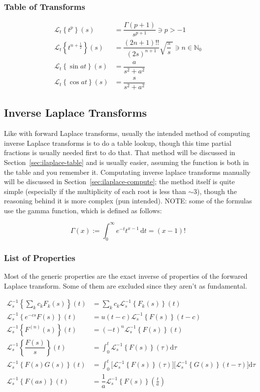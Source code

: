 \documentclass[12pt]{article}
\newcommand \Laplace [3] {\ensuremath{\mathscr{L}_{#1}\!\left\{#2\right\}\!\left(#3\right)}}
\newcommand \ILaplace [3] {\ensuremath{\mathscr{L}_{#1}^{-1}\!\left\{#2\right\}\!\left(#3\right)}}
\renewcommand \d [1] {\mathrm{d}{#1}}
\newcommand \dt {{\d t}}
\begin{document}
\subsubsection{Table of Transforms}\label{sec:laplace-table}

\begin{align}
	\Laplace{t}{t^p}{s} & = \dfrac{\Gamma(p + 1)}{s^{p + 1}} \ni p > -1 \\
	\Laplace{t}{t^{n + \tfrac 1 2}}{s} & = \dfrac{(2n + 1)!!} {(2s)^{n+1}} \sqrt{\dfrac \pi s\,} \ni n \in \mathbb N_0 \\
	\Laplace{t}{\sin a t}{s} & = \dfrac a {s^2 + a^2} \\
	\Laplace{t}{\cos a t}{s} & = \dfrac s {s^2 + a^2}
\end{align}

\subsection{Inverse Laplace Transforms}

Like with forward Laplace transforms, usually the intended method of computing inverse Laplace transforms is to do a table lookup, though this time partial fractions is usually needed first to do that. That method will be discussed in Section~\ref{sec:ilaplace-table} and is usually easier, assuming the function is both in the table and you remember it. Computating inverse laplace transforms manually will be discussed in Section~\ref{sec:ilaplace-compute}; the method itself is quite simple (especially if the multiplicity of each root is less than $\sim 3$), though the reasoning behind it is more complex (pun intended). NOTE: some of the formulas use the gamma function, which is defined as follows:

\begin{equation}
	\Gamma(x) := \int_0^\infty \!\! e^{-t} t^{x - 1} \, \dt = (x - 1)!
\end{equation}

\subsubsection{List of Properties}\label{sec:ilaplace-properties}

Most of the generic properties are the exact inverse of properties of the forwared Laplace transform. Some of them are excluded since they aren't as fundamental.

\begin{align}
	\ILaplace{s}{\sum_k c_k F_k(s)}{t} & = \sum_k c_k \ILaplace{s}{F_k(s)}{t} \\
	\ILaplace{s}{e^{-cs} F(s)}{t} & = u(t - c) \ILaplace{s}{F(s)}{t - c} \\
	\ILaplace{s}{F^{(n)}(s)}{t} & = (-t)^n \ILaplace{s}{F(s)}{t} \\
	\ILaplace{s}{\dfrac{F(s)} s}{t} & = \int_0^t \! \ILaplace{s}{F(s)}{\tau} \d\tau \\
	\ILaplace{s}{F(s) G(s)}{t} & = \int_0^t \! \Big[ \ILaplace{s}{F(s)}{\tau} \Big] \Big[\ILaplace{s}{G(s)}{t - \tau} \Big] \d\tau \\
	\ILaplace{s}{F(a s)}{t} & = \dfrac 1 a \ILaplace{s}{F(s)}{\tfrac t a}
\end{align}
\end{document}
